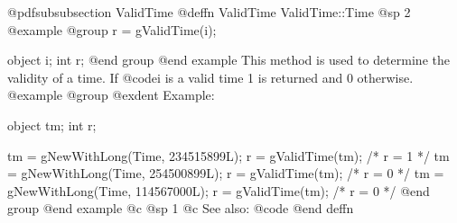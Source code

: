 @pdfsubsubsection {ValidTime}
@deffn {ValidTime} ValidTime::Time
@sp 2
@example
@group
r = gValidTime(i);

object  i;
int     r;
@end group
@end example
This method is used to determine the validity of a time.  If @code{i}
is a valid time 1 is returned and 0 otherwise.
@example
@group
@exdent Example:

object  tm;
int     r;

tm = gNewWithLong(Time, 234515899L);
r = gValidTime(tm);   /*  r = 1  */
tm = gNewWithLong(Time, 254500899L);
r = gValidTime(tm);   /*  r = 0  */
tm = gNewWithLong(Time, 114567000L);
r = gValidTime(tm);   /*  r = 0  */
@end group
@end example
@c @sp 1
@c See also:  @code{}
@end deffn













